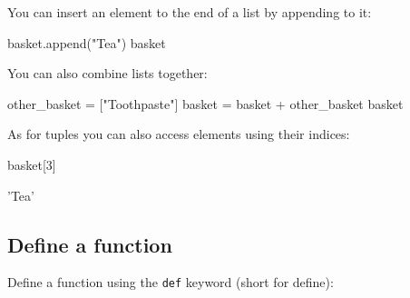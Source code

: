 \begin{raw}
\end{raw}





You can insert an element to the end of a list by appending to it:




\begin{pyin}
basket.append("Tea")
basket
\end{pyin}





\begin{raw}
\end{raw}





You can also combine lists together:




\begin{pyin}
other_basket = ["Toothpaste"]
basket = basket + other_basket
basket
\end{pyin}





\begin{pyin}
\end{pyin}





As for tuples you can also access elements using their indices:




\begin{pyin}
basket[3]
\end{pyin}





\begin{pyin}
'Tea'
\end{pyin}





\subsection{Define a function}
\label{sec:define_a_function}

Define a function using the \texttt{def} keyword (short for define):



